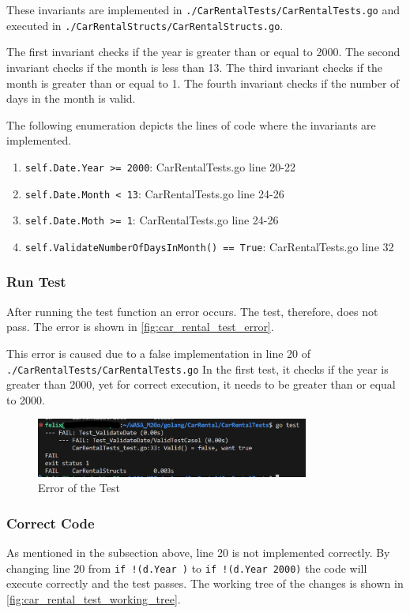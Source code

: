 These invariants are implemented in \texttt{./CarRentalTests/CarRentalTests.go} \hfill \linebreak and executed in \texttt{./CarRentalStructs/CarRentalStructs.go}.

The first invariant checks if the year is greater than or equal to 2000.
The second invariant checks if the month is less than 13.
The third invariant checks if the month is greater than or equal to 1.
The fourth invariant checks if the number of days in the month is valid.

The following enumeration depicts the lines of code where the invariants are implemented.
\begin{enumerate}
    \item \texttt{self.Date.Year >= 2000}: CarRentalTests.go line 20-22
    \item \texttt{self.Date.Month < 13}: CarRentalTests.go line 24-26
    \item \texttt{self.Date.Moth >= 1}: CarRentalTests.go line 24-26
    \item \texttt{self.ValidateNumberOfDaysInMonth() == True}: CarRentalTests.go line 32
\end{enumerate}

\subsubsection*{Run Test}
After running the test function an error occurs. 
The test, therefore, does not pass.
The error is shown in \autoref{fig:car_rental_test_error}.

This error is caused due to a false implementation in line 20 of \hfill \linebreak \texttt{./CarRentalTests/CarRentalTests.go}
In the first test, it checks if the year is greater than 2000, yet for correct execution, it needs to be greater than or equal to 2000.

\begin{figure}[H]
    \centering
    \includegraphics[width=0.8\textwidth]{figures/goLang/carRental/carRental_dateTestError.png}
    \caption{Error of the Test}
    \label{fig:car_rental_test_error}
\end{figure}

\subsubsection*{Correct Code}
As mentioned in the subsection above, line 20 is not implemented correctly.
By changing line 20 from \texttt{if !(d.Year )} to \texttt{if !(d.Year \>\= 2000)} the code will execute correctly and the test passes.
The working tree of the changes is shown in \autoref{fig:car_rental_test_working_tree}.

